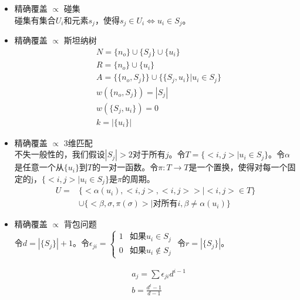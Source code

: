 \documentclass[twocolumn]{article}
\theoremstyle{nonumberplain}%
\begin{document}
\begin{CJK}{UTF8}{gbsn}
\begin{itemize}
    \item 精确覆盖 $\propto$ 碰集\\
        碰集有集合$U_i$和元素$s_j$，使得$s_j\in U_i\Leftrightarrow u_i\in S_j$。

    \item 精确覆盖 $\propto$ 斯坦纳树
        \begin{equation}\nonumber %
        \begin{aligned}
        &N=\{n_o\}\cup\{S_j\}\cup\{u_i\}\\
        &R=\{n_o\}\cup\{u_i\}\\
        &A=\{\{n_o,S_j\}\}\cup\{\{S_j,u_i\}|u_i\in S_j\}\\
        &w(\{n_o,S_j\})=|S_j|\\
        &w(\{S_j,u_i\})=0\\
        &k=|\{u_i\}|
        \end{aligned}
        \end{equation}

    \item 精确覆盖 $\propto$ 3维匹配\\
        不失一般性的，我们假设$|S_j|>2$对于所有$j$。令$T=\{<i,j>|u_i\in S_j\}$。令$\alpha$是任意一个从$\{u_i\}$到$T$的一对一函数。令$\pi:T\rightarrow T$是一个置换，使得对每一个固定的j，$\{<i,j>|u_i\in S_j\}$是$\pi$的周期。
        \begin{equation}\nonumber %
        \begin{aligned}
        U=&\{<\alpha(u_i),<i,j>,<i,j>>|<i,j>\in T\}\\
          &\cup\{<\beta,\sigma,\pi(\sigma)>|\text{对所有}i,\beta\neq \alpha(u_i)\}
        \end{aligned}
        \end{equation}

    \item 精确覆盖 $\propto$ 背包问题\\
        令$d=|\{S_j\}|+1$。令$\epsilon_{ji}=
        \left\{\begin{matrix}
            1 & \text{如果}u_i\in S_j \\
            0 & \text{如果}u_i\notin S_j 
        \end{matrix}\right.$ 令$r=|\{S_j\}|$。
        
        \begin{equation}\nonumber %
        \begin{aligned}
        &a_j=\sum\epsilon_{ji}d^{i-1}\\
        &b=\frac{d^t-1}{d-1}
        \end{aligned}
        \end{equation}


\end{itemize}
\end{CJK}
\end{document}
